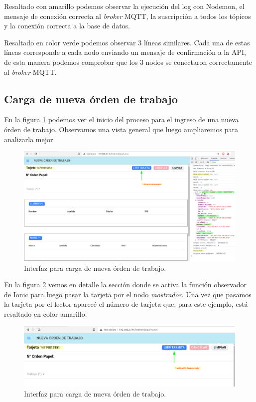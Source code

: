 Resaltado con amarillo podemos observar la ejecución del log con Nodemon, el mensaje de conexión correcta al \textit{broker} MQTT, la suscripción a todos los tópicos y la conexión correcta a la base de datos.

Resaltado en color verde podemos observar 3 líneas similares. Cada una de estas líneas corresponde a cada nodo enviando un mensaje de confirmación a la API, de esta manera podemos comprobar que los 3 nodos se conectaron correctamente al \textit{broker} MQTT. 

\subsection{Carga de nueva órden de trabajo}
\label{subsec:ensayonuevaorden}

En la figura \ref{fig:ensayonueva1} podemos ver el inicio del proceso para el ingreso de una nueva órden de trabajo. Observamos una vista general que luego ampliaremos para analizarla mejor.

\begin{figure}[H]
	\centering
	\includegraphics[width=\textwidth]{./Figures/ensayo-1/5.nueva.png}
	\caption{Interfaz para carga de nueva órden de trabajo.}
	\label{fig:ensayonueva1}
\end{figure}

En la figura \ref{fig:ensayonueva1-1} vemos en detalle la sección donde se activa la función observador de Ionic para luego pasar la tarjeta por el nodo \textit{mostrador}. Una vez que pasamos la tarjeta por el lector aparecé el número de tarjeta que, para este ejemplo, está resaltado en color amarillo.

\begin{figure}[H]
	\centering
	\includegraphics[width=\textwidth]{./Figures/ensayo-1/5.nueva-1.png}
	\caption{Interfaz para carga de nueva órden de trabajo.}
	\label{fig:ensayonueva1-1}
\end{figure}

